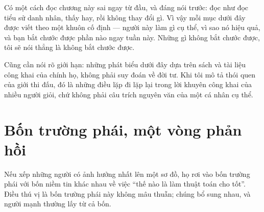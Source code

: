 \documentclass[../../algorithm.tex]{subfiles}
\begin{document}
Có một cách đọc chương này sai ngay từ đầu, và đáng nói trước: đọc như đọc tiểu sử danh nhân, thấy hay, rồi không thay đổi gì. Vì vậy mỗi mục dưới đây được viết theo một khuôn cố định --- người này làm gì cụ thể, vì sao nó hiệu quả, và bạn bắt chước được phần nào ngay tuần này. Những gì không bắt chước được, tôi sẽ nói thẳng là không bắt chước được.

Cũng cần nói rõ giới hạn: những phát biểu dưới đây dựa trên sách và tài liệu công khai của chính họ, không phải suy đoán về đời tư. Khi tôi mô tả thói quen của giới thi đấu, đó là những điều lặp đi lặp lại trong lời khuyên công khai của nhiều người giỏi, chứ không phải câu trích nguyên văn của một cá nhân cụ thể.

\section{Bốn trường phái, một vòng phản hồi}

Nếu xếp những người có ảnh hưởng nhất lên một sơ đồ, họ rơi vào bốn trường phái với bốn niềm tin khác nhau về việc ``thế nào là làm thuật toán cho tốt''. Điều thú vị là bốn trường phái này không mâu thuẫn; chúng bổ sung nhau, và người mạnh thường lấy từ cả bốn.
\end{document}
